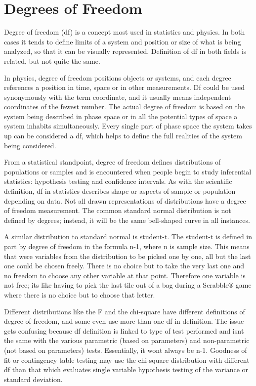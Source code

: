 \section{Degrees of Freedom}

Degree of freedom (df) is a concept most used in statistics and physics. In both cases it tends to define limits of a system and position or size of what is being analyzed, so that it can be visually represented. Definition of df in both fields is related, but not quite the same.

In physics, degree of freedom positions objects or systems, and each degree references a position in time, space or in other measurements. Df could be used synonymously with the term coordinate, and it usually means independent coordinates of the fewest number. The actual degree of freedom is based on the system being described in phase space or in all the potential types of space a system inhabits simultaneously. Every single part of phase space the system takes up can be considered a df, which helps to define the full realities of the system being considered.

From a statistical standpoint, degree of freedom defines distributions of populations or samples and is encountered when people begin to study inferential statistics: hypothesis testing and confidence intervals. As with the scientific definition, df in statistics describes shape or aspects of sample or population depending on data. Not all drawn representations of distributions have a degree of freedom measurement. The common standard normal distribution is not defined by degrees; instead, it will be the same bell-shaped curve in all instances.

A similar distribution to standard normal is student-t. The student-t is defined in part by degree of freedom in the formula n-1, where n is sample size. This means that were variables from the distribution to be picked one by one, all but the last one could be chosen freely. There is no choice but to take the very last one and no freedom to choose any other variable at that point. Therefore one variable is not free; its like having to pick the last tile out of a bag during a Scrabble® game where there is no choice but to choose that letter.

Different distributions like the F and the chi-square have different definitions of degree of freedom, and some even use more than one df in definition. The issue gets confusing because df definition is linked to type of test performed and isnt the same with the various parametric (based on parameters) and non-parametric (not based on parameters) tests. Essentially, it wont always be n-1. Goodness of fit or contingency table testing may use the chi-square distribution with different df than that which evaluates single variable hypothesis testing of the variance or standard deviation.

